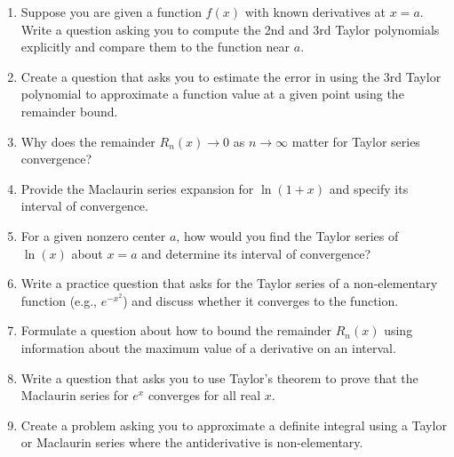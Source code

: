 \begin{enumerate}
  \item Suppose you are given a function \(f(x)\) with known derivatives at \(x=a\). Write a question asking you to compute the 2nd and 3rd Taylor polynomials explicitly and compare them to the function near \(a\).
  \item Create a question that asks you to estimate the error in using the 3rd Taylor polynomial to approximate a function value at a given point using the remainder bound.
  \item Why does the remainder \(R_n(x)\to 0\) as \(n\to\infty\) matter for Taylor series convergence?
  \item Provide the Maclaurin series expansion for \(\ln(1+x)\) and specify its interval of convergence.
  \item For a given nonzero center \(a\), how would you find the Taylor series of \(\ln(x)\) about \(x=a\) and determine its interval of convergence?
  \item Write a practice question that asks for the Taylor series of a non-elementary function (e.g., \(e^{-x^2}\)) and discuss whether it converges to the function.
  \item Formulate a question about how to bound the remainder \(R_n(x)\) using information about the maximum value of a derivative on an interval.
  \item Write a question that asks you to use Taylor's theorem to prove that the Maclaurin series for \(e^x\) converges for all real \(x\).
  \item Create a problem asking you to approximate a definite integral using a Taylor or Maclaurin series where the antiderivative is non-elementary.
\end{enumerate}
